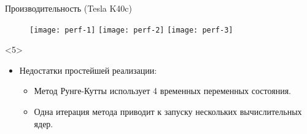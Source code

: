 \documentclass[@BEAMER_OPTIONS@]{beamer}
\begin{document}
\begin{frame}[fragile]{Производительность (Tesla K40c)}
    \begin{figure}
         {\texttt{[image: perf-1]}}%
         {\texttt{[image: perf-2]}}%
         {\texttt{[image: perf-3]}}%
    \end{figure}
    \vspace{-1\baselineskip}
    \begin{uncoverenv}<5>
        \begin{itemize}
            \item Недостатки простейшей реализации:
                \begin{itemize}
                    \item Метод Рунге-Кутты использует 4 временных переменных
                        состояния.
                    \item Одна итерация метода приводит к запуску нескольких
                        вычислительных ядер.
                \end{itemize}
        \end{itemize}
    \end{uncoverenv}
\end{frame}
\end{document}
